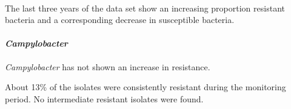 \documentclass[11pt]{article}
\begin{document}
    \begin{center}
    \end{center}
    { \hspace*{\fill} \\}
    
    The last three years of the data set show an increasing proportion
resistant bacteria and a corresponding decrease in susceptible bacteria.

    \hypertarget{campylobacter}{%
\paragraph{\texorpdfstring{\emph{Campylobacter}}{Campylobacter}}\label{campylobacter}}

    \emph{Campylobacter} has not shown an increase in resistance.

About 13\% of the isolates were consistently resistant during the
monitoring period. No intermediate resistant isolates were found.
\end{document}
